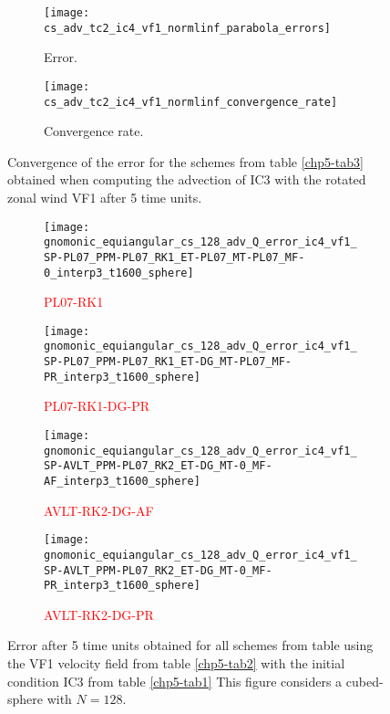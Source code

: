 \begin{figure}[!htb]
	\centering
	\begin{subfigure}{0.42\textwidth}
		\centering
		\texttt{[image: cs\_adv\_tc2\_ic4\_vf1\_normlinf\_parabola\_errors]}
		\caption{Error.\label{chp5-adv2-error}}
	\end{subfigure}
	\begin{subfigure}{0.42\textwidth}
		\centering
		\texttt{[image: cs\_adv\_tc2\_ic4\_vf1\_normlinf\_convergence\_rate]}
		\caption{Convergence rate.\label{chp5-adv2-cr}}
	\end{subfigure}
	\caption{Convergence of the error for the schemes from table \ref{chp5-tab3} obtained when computing the advection of IC3  with the rotated zonal wind VF1 after 5 time units.
	\label{chp5-error-adv2}}
\end{figure}


\begin{figure}[!htb]
	\centering
	\begin{subfigure}{0.3\textwidth}
		\centering
		\texttt{[image: gnomonic\_equiangular\_cs\_128\_adv\_Q\_error\_ic4\_vf1\_SP-PL07\_PPM-PL07\_RK1\_ET-PL07\_MT-PL07\_MF-0\_interp3\_t1600\_sphere]}
		\caption{\textcolor{red}{PL07-RK1} \label{chp5-adv2-s1}}
	\end{subfigure}
	\begin{subfigure}{0.3\textwidth}
		\centering
		\texttt{[image: gnomonic\_equiangular\_cs\_128\_adv\_Q\_error\_ic4\_vf1\_SP-PL07\_PPM-PL07\_RK1\_ET-DG\_MT-PL07\_MF-PR\_interp3\_t1600\_sphere]}
		\caption{\textcolor{red}{PL07-RK1-DG-PR} \label{chp5-adv2-s2}}
	\end{subfigure}

	\begin{subfigure}{0.3\textwidth}
		\centering
		\texttt{[image: gnomonic\_equiangular\_cs\_128\_adv\_Q\_error\_ic4\_vf1\_SP-AVLT\_PPM-PL07\_RK2\_ET-DG\_MT-0\_MF-AF\_interp3\_t1600\_sphere]}
		\caption{\textcolor{red}{AVLT-RK2-DG-AF} \label{chp5-adv2-s3}}
	\end{subfigure}
	\begin{subfigure}{0.3\textwidth}
		\centering
		\texttt{[image: gnomonic\_equiangular\_cs\_128\_adv\_Q\_error\_ic4\_vf1\_SP-AVLT\_PPM-PL07\_RK2\_ET-DG\_MT-0\_MF-PR\_interp3\_t1600\_sphere]}
		\caption{\textcolor{red}{AVLT-RK2-DG-PR} \label{chp5-adv2-s4}}
	\end{subfigure}
	\caption{ Error after 5 time units obtained for all schemes from table using the VF1 velocity field from table \ref{chp5-tab2} with the initial condition IC3 from  table \ref{chp5-tab1} 
		This figure considers a cubed-sphere with $N=128$. \label{chp5-adv2}}
\end{figure}


